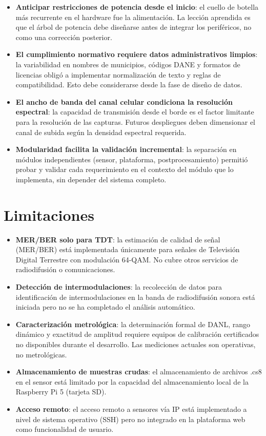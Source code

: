\begin{itemize}[leftmargin=*]
    \item \textbf{Anticipar restricciones de potencia desde el inicio}: el cuello de botella más recurrente en el hardware fue la alimentación. La lección aprendida es que el árbol de potencia debe diseñarse antes de integrar los periféricos, no como una corrección posterior.
    \item \textbf{El cumplimiento normativo requiere datos administrativos limpios}: la variabilidad en nombres de municipios, códigos DANE y formatos de licencias obligó a implementar normalización de texto y reglas de compatibilidad. Esto debe considerarse desde la fase de diseño de datos.
    \item \textbf{El ancho de banda del canal celular condiciona la resolución espectral}: la capacidad de transmisión desde el borde es el factor limitante para la resolución de las capturas. Futuros despliegues deben dimensionar el canal de subida según la densidad espectral requerida.
    \item \textbf{Modularidad facilita la validación incremental}: la separación en módulos independientes (sensor, plataforma, postprocesamiento) permitió probar y validar cada requerimiento en el contexto del módulo que lo implementa, sin depender del sistema completo.
\end{itemize}

\section{Limitaciones}

\begin{itemize}[leftmargin=*]
    \item \textbf{MER/BER solo para TDT}: la estimación de calidad de señal (MER/BER) está implementada únicamente para señales de Televisión Digital Terrestre con modulación 64-QAM. No cubre otros servicios de radiodifusión o comunicaciones.
    \item \textbf{Detección de intermodulaciones}: la recolección de datos para identificación de intermodulaciones en la banda de radiodifusión sonora está iniciada pero no se ha completado el análisis automático.
    \item \textbf{Caracterización metrológica}: la determinación formal de DANL, rango dinámico y exactitud de amplitud requiere equipos de calibración certificados no disponibles durante el desarrollo. Las mediciones actuales son operativas, no metrológicas.
    \item \textbf{Almacenamiento de muestras crudas}: el almacenamiento de archivos .cs8 en el sensor está limitado por la capacidad del almacenamiento local de la Raspberry Pi 5 (tarjeta SD).
    \item \textbf{Acceso remoto}: el acceso remoto a sensores vía IP está implementado a nivel de sistema operativo (SSH) pero no integrado en la plataforma web como funcionalidad de usuario.
\end{itemize}


